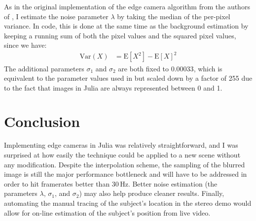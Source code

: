 \documentclass{article}
\begin{document}
As in the original implementation of the edge camera algorithm from the authors of \cite{bouman_turningcornerscameras2017}, I estimate the noise parameter $\lambda$ by taking the median of the per-pixel variance. In code, this is done at the same time as the background estimation by keeping a running sum of both the pixel values and the squared pixel values, since we have:
\begin{align}
\text{Var}(X) &= \text{E}[X^2] - \text{E}[X]^2
\end{align}
The additional parameters $\sigma_1$ and $\sigma_2$ are both fixed to $0.00033$, which is equivalent to the parameter values used in \cite{bouman_turningcornerscameras2017} but scaled down by a factor of 255 due to the fact that images in Julia are always represented between 0 and 1.

\section{Conclusion}

Implementing edge cameras in Julia was relatively straightforward, and I was surprised at how easily the technique could be applied to a new scene without any modification. Despite the interpolation scheme, the sampling of the blurred image is still the major performance bottleneck and will have to be addressed in order to hit framerates better than 30\,Hz. Better noise estimation (the parameters $\lambda$, $\sigma_1$, and $\sigma_2$) may also help produce cleaner results. Finally, automating the manual tracing of the subject's location in the stereo demo would allow for on-line estimation of the subject's position from live video.




\end{document}
